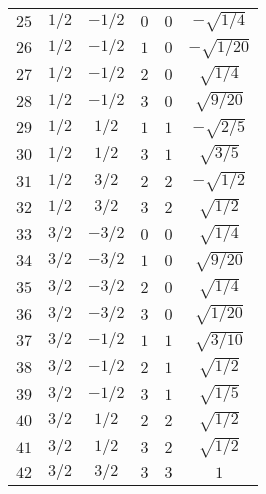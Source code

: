 \begin{table}
\begin{center}
\begin{tabular}{|c|c|c|c|c|c|}
$25$ & $1/2$ & $-1/2$ & $0$ & $0$ & $-\sqrt{1/4}$ \\ 
$26$ & $1/2$ & $-1/2$ & $1$ & $0$ & $-\sqrt{1/20}$ \\ 
$27$ & $1/2$ & $-1/2$ & $2$ & $0$ & $\sqrt{1/4}$ \\ 
$28$ & $1/2$ & $-1/2$ & $3$ & $0$ & $\sqrt{9/20}$ \\ 
$29$ & $1/2$ & $1/2$ & $1$ & $1$ & $-\sqrt{2/5}$ \\ 
$30$ & $1/2$ & $1/2$ & $3$ & $1$ & $\sqrt{3/5}$ \\ 
$31$ & $1/2$ & $3/2$ & $2$ & $2$ & $-\sqrt{1/2}$ \\ 
$32$ & $1/2$ & $3/2$ & $3$ & $2$ & $\sqrt{1/2}$ \\ 
$33$ & $3/2$ & $-3/2$ & $0$ & $0$ & $\sqrt{1/4}$ \\ 
$34$ & $3/2$ & $-3/2$ & $1$ & $0$ & $\sqrt{9/20}$ \\ 
$35$ & $3/2$ & $-3/2$ & $2$ & $0$ & $\sqrt{1/4}$ \\ 
$36$ & $3/2$ & $-3/2$ & $3$ & $0$ & $\sqrt{1/20}$ \\ 
$37$ & $3/2$ & $-1/2$ & $1$ & $1$ & $\sqrt{3/10}$ \\ 
$38$ & $3/2$ & $-1/2$ & $2$ & $1$ & $\sqrt{1/2}$ \\ 
$39$ & $3/2$ & $-1/2$ & $3$ & $1$ & $\sqrt{1/5}$ \\ 
$40$ & $3/2$ & $1/2$ & $2$ & $2$ & $\sqrt{1/2}$ \\ 
$41$ & $3/2$ & $1/2$ & $3$ & $2$ & $\sqrt{1/2}$ \\ 
$42$ & $3/2$ & $3/2$ & $3$ & $3$ & $1$ \\ 
\hline 
\end{tabular}
\end{center}
\end{table}


